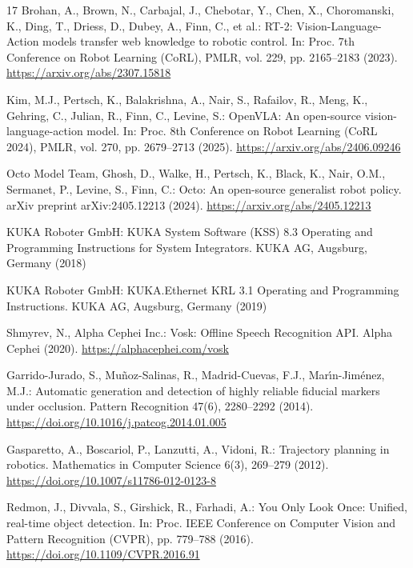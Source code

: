\documentclass{svproc}
\begin{document}
\begin{thebibliography}{17}
Brohan, A., Brown, N., Carbajal, J., Chebotar, Y., Chen, X., Choromanski, K., Ding, T., Driess, D., Dubey, A., Finn, C., et al.: RT-2: Vision-Language-Action models transfer web knowledge to robotic control. In: Proc. 7th Conference on Robot Learning (CoRL), PMLR, vol. 229, pp. 2165--2183 (2023). \url{https://arxiv.org/abs/2307.15818}

Kim, M.J., Pertsch, K., Balakrishna, A., Nair, S., Rafailov, R., Meng, K., Gehring, C., Julian, R., Finn, C., Levine, S.: OpenVLA: An open-source vision-language-action model. In: Proc. 8th Conference on Robot Learning (CoRL 2024), PMLR, vol. 270, pp. 2679--2713 (2025). \url{https://arxiv.org/abs/2406.09246}

Octo Model Team, Ghosh, D., Walke, H., Pertsch, K., Black, K., Nair, O.M., Sermanet, P., Levine, S., Finn, C.: Octo: An open-source generalist robot policy. arXiv preprint arXiv:2405.12213 (2024). \url{https://arxiv.org/abs/2405.12213}

KUKA Roboter GmbH: KUKA System Software (KSS) 8.3 Operating and Programming Instructions for System Integrators. KUKA AG, Augsburg, Germany (2018)

KUKA Roboter GmbH: KUKA.Ethernet KRL 3.1 Operating and Programming Instructions. KUKA AG, Augsburg, Germany (2019)

Shmyrev, N., Alpha Cephei Inc.: Vosk: Offline Speech Recognition API. Alpha Cephei (2020). \url{https://alphacephei.com/vosk}

Garrido-Jurado, S., Mu{\~n}oz-Salinas, R., Madrid-Cuevas, F.J., Mar{\'\i}n-Jim{\'e}nez, M.J.: Automatic generation and detection of highly reliable fiducial markers under occlusion. Pattern Recognition 47(6), 2280--2292 (2014). \url{https://doi.org/10.1016/j.patcog.2014.01.005}

Gasparetto, A., Boscariol, P., Lanzutti, A., Vidoni, R.: Trajectory planning in robotics. Mathematics in Computer Science 6(3), 269--279 (2012). \url{https://doi.org/10.1007/s11786-012-0123-8}

Redmon, J., Divvala, S., Girshick, R., Farhadi, A.: You Only Look Once: Unified, real-time object detection. In: Proc. IEEE Conference on Computer Vision and Pattern Recognition (CVPR), pp. 779--788 (2016). \url{https://doi.org/10.1109/CVPR.2016.91}

\end{thebibliography}
\end{document}
